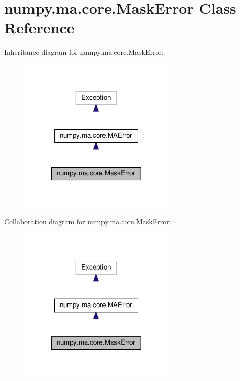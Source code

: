 \hypertarget{classnumpy_1_1ma_1_1core_1_1MaskError}{}\section{numpy.\+ma.\+core.\+Mask\+Error Class Reference}
\label{classnumpy_1_1ma_1_1core_1_1MaskError}


Inheritance diagram for numpy.\+ma.\+core.\+Mask\+Error\+:
\nopagebreak
\begin{figure}[H]
\begin{center}
\leavevmode
\includegraphics[width=212pt]{classnumpy_1_1ma_1_1core_1_1MaskError__inherit__graph}
\end{center}
\end{figure}


Collaboration diagram for numpy.\+ma.\+core.\+Mask\+Error\+:
\nopagebreak
\begin{figure}[H]
\begin{center}
\leavevmode
\includegraphics[width=212pt]{classnumpy_1_1ma_1_1core_1_1MaskError__coll__graph}
\end{center}
\end{figure}


